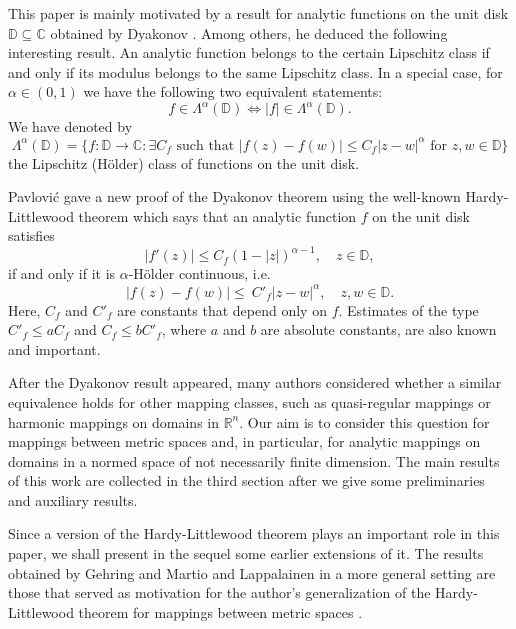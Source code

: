 \documentclass{amsart}
\theoremstyle{definition}
\numberwithin{equation}{section}
\begin{document}
This paper is mainly motivated by a result for analytic functions on the unit disk $\mathbb{D}\subseteq\mathbb{C}$
obtained by Dyakonov \cite{DYAKONOV.ACTM}. Among others, he deduced the following interesting result. An analytic
function belongs to the certain Lipschitz class if and only if its modulus belongs to the same Lipschitz class. In
a special case, for $\alpha\in (0,1)$ we have the following two equivalent statements:
\begin{equation*}
f\in \Lambda ^{\alpha} (\mathbb{D}) \Leftrightarrow  |f|\in \Lambda ^{\alpha} (\mathbb{D}).
\end{equation*}
We have denoted by
\begin{equation*}
\Lambda ^\alpha (\mathbb{D}) = \{f:\mathbb {D}\to \mathbb{C}: \exists C_f \text{ such that }
|f(z) - f(w)|\le  C_f|z-w|^\alpha \text{ for } z,w\in \mathbb {D}\}
\end{equation*}
the Lipschitz  (H\"{o}lder) class of functions on the unit disk.


Pavlovi\'{c} \cite{PAVLOVIC.ACTM} gave a new proof of the Dyakonov theorem using the well-known Hardy-Littlewood
theorem which says that an analytic function $f$ on the unit disk satisfies
\begin{equation}\label{EQ.HL.1}
| f'(z) |\le C_f(1- |z|)^{\alpha-1},\quad  z\in \mathbb{D},
\end{equation}
if and only if it is $\alpha$-H\"{o}lder continuous, i.e.
\begin{equation}\label{EQ.HL.2}
|f(z) - f (w)| \le \ C'_f |z-w|^\alpha,\quad z,w\in\mathbb{D}.
\end{equation}
Here, $C_f$ and $C'_f$ are constants that depend only on $f$. Estimates of the type $C'_f \le a C_f$ and
$C_f\le b C'_f$, where $a$ and $b$ are absolute constants, are also known and important.

After the Dyakonov result appeared, many authors considered whether a similar equivalence holds for other mapping
classes, such as quasi-regular mappings or harmonic mappings on domains in $\mathbb{R}^n$. Our aim is to consider this
question for mappings between metric spaces and, in particular, for analytic mappings on domains in a normed space of
not necessarily finite dimension. The main results of this work are collected in the third section after we give some
preliminaries and auxiliary results.

Since a version of the Hardy-Littlewood theorem plays an important role in this paper, we shall present in the sequel
some earlier extensions of it. The results obtained by Gehring and Martio and Lappalainen in a more general setting
are those that served as motivation for the author's generalization of the Hardy-Littlewood theorem for mappings
between metric spaces \cite{MARKOVIC.JGA.2}.
\end{document}
